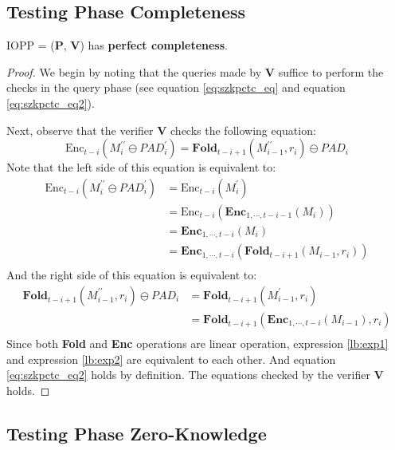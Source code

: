 \subsection{Testing Phase Completeness}

\begin{lemma}
\label{lemma:szkpctcc}

IOPP = ($\textbf{P}$, $\textbf{V}$) has \textbf{perfect completeness}.

\end{lemma}
\begin{proof}
We begin by noting that the queries made by $\textbf{V}$ suffice to perform the checks in the query phase (see equation \ref{eq:szkpctc_eq} and equation \ref{eq:szkpctc_eq2}).

Next, observe that the verifier $\textbf{V}$ checks the following equation:
$$
    \text{Enc}_{t-i}(M_i^{\prime\prime} \ominus PAD_{i}^\prime) = \textbf{Fold}_{t-i+1}(M_{i-1}^{\prime\prime}, r_i) \ominus PAD_i 
$$
Note that the left side of this equation is equivalent to:
\begin{align}
\text{Enc}_{t-i}(M_i^{\prime\prime} \ominus PAD_{i}^\prime) &= \text{Enc}_{t-i}(M_i^\prime) \nonumber \\
&= \text{Enc}_{t-i}(\textbf{Enc}_{1, \cdots, t- i - 1}(M_i)) \nonumber \\
&= \textbf{Enc}_{1, \cdots, t-i}(M_i) \nonumber \\
&= \textbf{Enc}_{1, \cdots, t-i}(\textbf{Fold}_{t-i+1}(M_{i-1}, r_i)) \label{lb:exp1} \\
\end{align}
And the right side of this equation is equivalent to:
\begin{align}
\textbf{Fold}_{t-i+1}(M_{i-1}^{\prime\prime}, r_i) \ominus PAD_i &= \textbf{Fold}_{t-i+1}(M_{i-1}^\prime, r_i) \nonumber \\
&= \textbf{Fold}_{t-i+1}(\textbf{Enc}_{1, \cdots, t- i}(M_{i-1}), r_i) \label{lb:exp2} \\
\end{align}
Since both \textbf{Fold} and \textbf{Enc} operations are linear operation, expression \ref{lb:exp1} and  expression \ref{lb:exp2} are equivalent to each other. And equation \ref{eq:szkpctc_eq2} holds by definition.
The equations checked by the verifier $\textbf{V}$ holds.

\end{proof}


\subsection{Testing Phase Zero-Knowledge}

